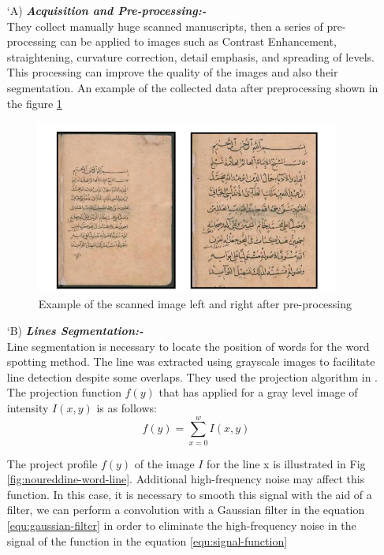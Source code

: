 \begin{itemize}[labelindent=1em,labelsep=0.25cm,leftmargin=*]
        \item[\char `A)] \textit{\textbf{Acquisition and Pre-processing:-}} \\
        They collect manually huge scanned manuscripts, then a  series of pre-processing can be applied to images such as Contrast Enhancement, straightening, curvature correction, detail emphasis, and spreading of levels. This processing can improve the quality of the images and also their segmentation. An example of the collected data after preprocessing shown in the figure \ref{fig:noureddine-data}
        \begin{figure}[!htb]
            \centering
            \includegraphics[width=10cm]{images/noureddine-data.png}
            \caption{Example of the scanned image left and right after pre-processing}
            \label{fig:noureddine-data}
        \end{figure}
        
        \item[\char `B)] \textit{\textbf{Lines Segmentation:-}} \\
        Line segmentation is necessary to locate the position of words for the word spotting method. The line was extracted using grayscale images to facilitate line detection despite some overlaps. They used the projection algorithm in \cite{ManmathaProjectionAlgorithm}. The projection function $f(y)$ that has applied for a gray level image of intensity $I(x, y)$ is as follows:
        \begin{equation}
            f(y) = \sum_{x=0}^w I(x, y)
        \end{equation}
        
        The project profile $f(y)$ of the image $I$ for the line x is illustrated in Fig \ref{fig:noureddine-word-line}. Additional high-frequency noise may affect this function. In this case, it is necessary to smooth this signal with the aid of a filter, we can perform a convolution with a Gaussian filter in the equation \ref{equ:gaussian-filter} in order to eliminate the high-frequency noise in the signal of the function in the equation \ref{equ:signal-function}
        

\end{itemize}
